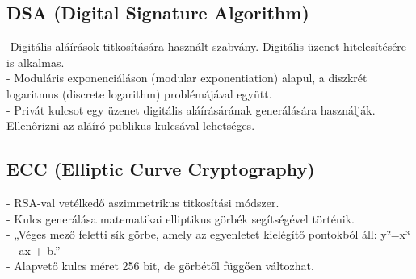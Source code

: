 \subsection{DSA (Digital Signature Algorithm)}
\noindent-Digitális aláírások titkosítására használt szabvány. Digitális üzenet hitelesítésére is alkalmas.
\vspace{5pt}\\- Moduláris exponenciáláson (modular exponentiation) alapul, a diszkrét logaritmus (discrete logarithm) problémájával együtt.
\vspace{5pt}\\- Privát kulcsot egy üzenet digitális aláírásárának generálására használják. Ellenőrizni az aláíró publikus kulcsával lehetséges.


\subsection{ECC (Elliptic Curve Cryptography)}
\noindent- RSA-val vetélkedő aszimmetrikus titkosítási módszer.
\vspace{5pt}\\- Kulcs generálása matematikai elliptikus görbék segítségével történik.
\vspace{5pt}\\- „Véges mező feletti sík görbe, amely az egyenletet kielégítő pontokból áll: y²=x³ + ax + b.”
\vspace{5pt}\\- Alapvető kulcs méret 256 bit, de görbétől függően változhat.

